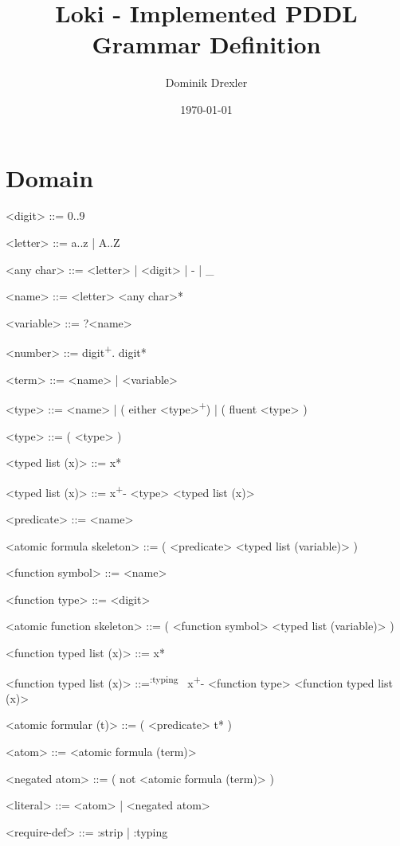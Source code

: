 \documentclass[]{article}
\title{Loki - Implemented PDDL Grammar Definition}
\author{Dominik Drexler}
\date{\today}
\newcommand{\plus}{\textsuperscript{+}}
\newcommand{\typing}{\textsuperscript{:typing}~}
\begin{document}
\maketitle

\section{Domain}

\begin{grammar}
    <digit> ::= 0..9

    <letter> ::= a..z | A..Z

    <any char> ::= <letter> | <digit> | - | _

    <name> ::= <letter> <any char>*

    <variable> ::= ?<name>

    <number> ::= digit\plus . digit*   %

    <term> ::= <name> | <variable>


    <type> ::= <name> | ( either <type>\plus ) | ( fluent <type> )

    <type> ::= ( <type> )

    <typed list (x)> ::= x*

    <typed list (x)> ::= x\plus - <type> <typed list (x)>


    <predicate> ::= <name>

    <atomic formula skeleton> ::= ( <predicate> <typed list (variable)> )



    <function symbol> ::= <name>

    <function type> ::= <digit>

    <atomic function skeleton> ::= ( <function symbol> <typed list (variable)> )

    <function typed list (x)> ::= x*

    <function typed list (x)> ::=\typing{} x\plus - <function type> <function typed list (x)>


    <atomic formular (t)> ::= ( <predicate> t* )

    <atom> ::= <atomic formula (term)>

    <negated atom> ::= ( not <atomic formula (term)> )

    <literal> ::= <atom> | <negated atom>


    <require-def> ::= :strip | :typing


\end{grammar}
\end{document}
